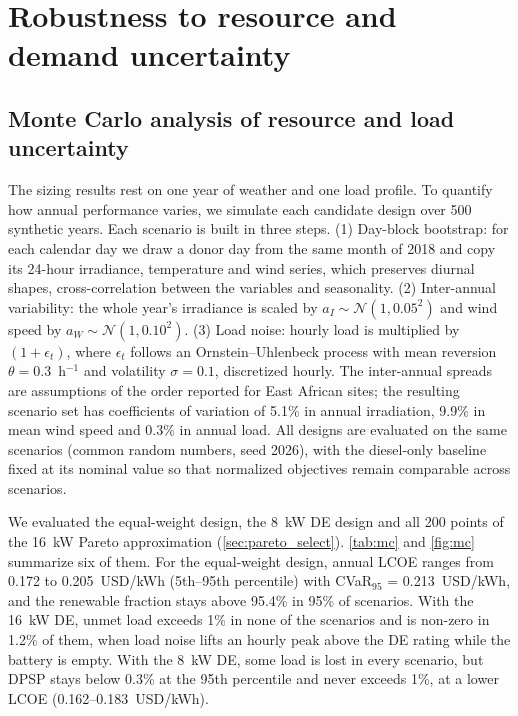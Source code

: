 \documentclass[final,3p,times]{elsarticle}
\begin{document}
\section{Robustness to resource and demand uncertainty}

\subsection{Monte Carlo analysis of resource and load uncertainty\label{sec:mc}}
The sizing results rest on one year of weather and one load profile. To quantify how annual performance varies, we simulate each candidate design over 500 synthetic years. Each scenario is built in three steps. (1) Day-block bootstrap: for each calendar day we draw a donor day from the same month of 2018 and copy its 24-hour irradiance, temperature and wind series, which preserves diurnal shapes, cross-correlation between the variables and seasonality. (2) Inter-annual variability: the whole year's irradiance is scaled by $a_I \sim \mathcal{N}(1, 0.05^2)$ and wind speed by $a_W \sim \mathcal{N}(1, 0.10^2)$. (3) Load noise: hourly load is multiplied by $(1 + \epsilon_t)$, where $\epsilon_t$ follows an Ornstein--Uhlenbeck process with mean reversion $\theta = 0.3$~h$^{-1}$ and volatility $\sigma = 0.1$, discretized hourly. The inter-annual spreads are assumptions of the order reported for East African sites; the resulting scenario set has coefficients of variation of 5.1\% in annual irradiation, 9.9\% in mean wind speed and 0.3\% in annual load. All designs are evaluated on the same scenarios (common random numbers, seed 2026), with the diesel-only baseline fixed at its nominal value so that normalized objectives remain comparable across scenarios.

We evaluated the equal-weight design, the 8~kW DE design and all 200 points of the 16~kW Pareto approximation (\cref{sec:pareto_select}). \cref{tab:mc} and \cref{fig:mc} summarize six of them. For the equal-weight design, annual LCOE ranges from 0.172 to 0.205~USD/kWh (5th--95th percentile) with CVaR$_{95}$ = 0.213~USD/kWh, and the renewable fraction stays above 95.4\% in 95\% of scenarios. With the 16~kW DE, unmet load exceeds 1\% in none of the scenarios and is non-zero in 1.2\% of them, when load noise lifts an hourly peak above the DE rating while the battery is empty. With the 8~kW DE, some load is lost in every scenario, but DPSP stays below 0.3\% at the 95th percentile and never exceeds 1\%, at a lower LCOE (0.162--0.183~USD/kWh).
\end{document}
